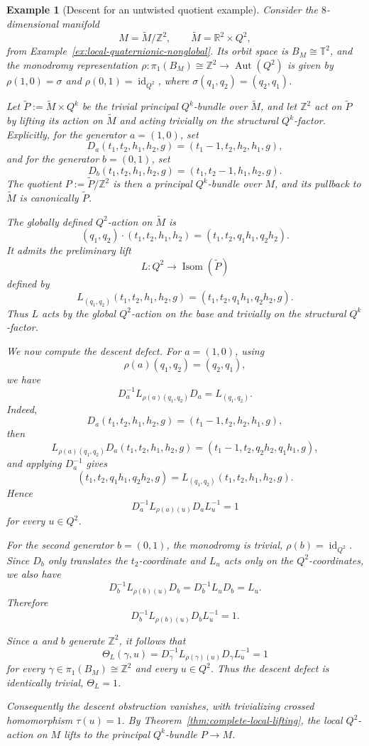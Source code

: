 \documentclass[11pt,a4paper]{article}
\numberwithin{equation}{section}
\newtheorem{example}[definition]{Example}
\theoremstyle{named}
\begin{document}
 \begin{example}[Descent for an untwisted quotient example]
\label{ex:descent-torus-quotient}
Consider the \(8\)-dimensional manifold
\[
M=\widetilde M/\mathbb Z^2,
\qquad
\widetilde M=\mathbb R^2\times Q^2,
\]
from Example~\ref{ex:local-quaternionic-nonglobal}. Its orbit space is \(B_M\cong \mathbb T^2\), and the monodromy representation \(\rho:\pi_1(B_M)\cong \mathbb Z^2 \longrightarrow \operatorname{Aut}(Q^2)\) is given by \(\rho(1,0)=\sigma\) and \(\rho(0,1)=\operatorname{id}_{Q^2}\), where \(\sigma(q_1,q_2)=(q_2,q_1)\).

Let \(\widetilde P:=\widetilde M\times Q^k\) be the trivial principal \(Q^k\)-bundle over \(\widetilde M\), and let \(\mathbb Z^2\) act on \(\widetilde P\) by lifting its action on \(\widetilde M\) and acting trivially on the structural \(Q^k\)-factor. Explicitly, for the generator \(a=(1,0)\), set
\[
D_a(t_1,t_2,h_1,h_2,g)
=
(t_1-1,t_2,h_2,h_1,g),
\]
and for the generator \(b=(0,1)\), set
\[
D_b(t_1,t_2,h_1,h_2,g)
=
(t_1,t_2-1,h_1,h_2,g).
\]
The quotient \(P:=\widetilde P/\mathbb Z^2\) is then a principal \(Q^k\)-bundle over \(M\), and its pullback to
\(\widetilde M\) is canonically \(\widetilde P\).

The globally defined \(Q^2\)-action on \(\widetilde M\) is
\[
(q_1,q_2)\cdot(t_1,t_2,h_1,h_2)
=
(t_1,t_2,q_1h_1,q_2h_2).
\]
It admits the preliminary lift
\[
L:Q^2\longrightarrow \operatorname{Isom}(\widetilde P)
\]
defined by
\[
L_{(q_1,q_2)}(t_1,t_2,h_1,h_2,g)
=
(t_1,t_2,q_1h_1,q_2h_2,g).
\]
Thus \(L\) acts by the global \(Q^2\)-action on the base and trivially on
the structural \(Q^k\)-factor.

We now compute the descent defect. For \(a=(1,0)\), using
\[
\rho(a)(q_1,q_2)=(q_2,q_1),
\]
we have
\[
D_a^{-1}L_{\rho(a)(q_1,q_2)}D_a
=
L_{(q_1,q_2)}.
\]
Indeed,
\[
D_a(t_1,t_2,h_1,h_2,g)
=
(t_1-1,t_2,h_2,h_1,g),
\]
then
\[
L_{\rho(a)(q_1,q_2)}D_a(t_1,t_2,h_1,h_2,g)
=
(t_1-1,t_2,q_2h_2,q_1h_1,g),
\]
and applying \(D_a^{-1}\) gives
\[
(t_1,t_2,q_1h_1,q_2h_2,g)
=
L_{(q_1,q_2)}(t_1,t_2,h_1,h_2,g).
\]
Hence
\[
D_a^{-1}L_{\rho(a)(u)}D_aL_u^{-1}=1
\]
for every \(u\in Q^2\).

For the second generator \(b=(0,1)\), the monodromy is trivial, \(\rho(b)=\operatorname{id}_{Q^2}\). Since \(D_b\) only translates the \(t_2\)-coordinate and \(L_u\) acts only on the \(Q^2\)-coordinates, we also have
\[
D_b^{-1}L_{\rho(b)(u)}D_b
=
D_b^{-1}L_uD_b
=
L_u.
\]
Therefore
\[
D_b^{-1}L_{\rho(b)(u)}D_bL_u^{-1}=1.
\]

Since \(a\) and \(b\) generate \(\mathbb Z^2\), it follows that
\[
\Theta_L(\gamma,u)
=
D_\gamma^{-1}L_{\rho(\gamma)(u)}D_\gamma L_u^{-1}
=
1
\]
for every \(\gamma\in\pi_1(B_M)\cong\mathbb Z^2\) and every \(u\in Q^2\). Thus the descent defect is identically trivial, \(\Theta_L=1\).

Consequently the descent obstruction vanishes, with trivializing crossed homomorphism \(\tau(u)=1\). By Theorem~\ref{thm:complete-local-lifting}, the local \(Q^2\)-action on \(M\) lifts to the principal \(Q^k\)-bundle \(P\longrightarrow M\).
\end{example}
\end{document}
